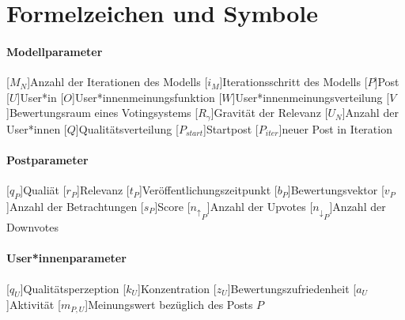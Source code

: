 \cleardoublepage
{}

\chapter*{Formelzeichen und Symbole}

\subsubsection*{Modellparameter}
\begin{acronym}[LONGEST]
[\ensuremath{M_N}]{Anzahl der Iterationen des Modells}
[\ensuremath{i_M}]{Iterationsschritt des Modells}
[\ensuremath{P}]{Post}
[\ensuremath{U}]{User*in}
[\ensuremath{O}]{User*innenmeinungsfunktion}
[\ensuremath{W}]{User*innenmeinungsverteilung}
[\ensuremath{V}]{Bewertungsraum eines Votingsystems}
[\ensuremath{R_\gamma}]{Gravität der Relevanz}
[\ensuremath{U_N}]{Anzahl der User*innen}
[\ensuremath{Q}]{Qualitätsverteilung}
[\ensuremath{{P_{start}}}]{Startpost}
[\ensuremath{{P_{iter}}}]{neuer Post in Iteration}
\end{acronym}

\subsubsection*{Postparameter}
\begin{acronym}[LONGEST]
[\ensuremath{q_P}]{Qualiät}
[\ensuremath{r_P}]{Relevanz}
[\ensuremath{t_P}]{Veröffentlichungszeitpunkt}
[\ensuremath{b_P}]{Bewertungsvektor}
[\ensuremath{v_P}]{Anzahl der Betrachtungen}
[\ensuremath{s_P}]{Score}
[\ensuremath{{n_\uparrow}_P}]{Anzahl der Upvotes}
[\ensuremath{{n_\downarrow}_P}]{Anzahl der Downvotes}
\end{acronym}

\subsubsection*{User*innenparameter}
\begin{acronym}[LONGEST]
	[\ensuremath{q_U}]{Qualitätsperzeption}
	[\ensuremath{k_U}]{Konzentration}
	[\ensuremath{z_U}]{Bewertungszufriedenheit}
	[\ensuremath{a_U}]{Aktivität}
	[\ensuremath{m_{P,U}}]{Meinungswert bezüglich des Posts $P$}
\end{acronym}


